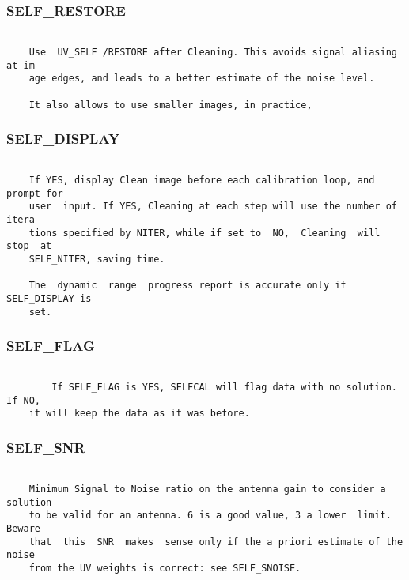\subsubsection{SELF\_RESTORE}
\begin{verbatim}

    Use  UV_SELF /RESTORE after Cleaning. This avoids signal aliasing at im-
    age edges, and leads to a better estimate of the noise level.

    It also allows to use smaller images, in practice,

\end{verbatim}
\subsubsection{SELF\_DISPLAY}
\begin{verbatim}

    If YES, display Clean image before each calibration loop, and prompt for
    user  input. If YES, Cleaning at each step will use the number of itera-
    tions specified by NITER, while if set to  NO,  Cleaning  will  stop  at
    SELF_NITER, saving time.

    The  dynamic  range  progress report is accurate only if SELF_DISPLAY is
    set.

\end{verbatim}
\subsubsection{SELF\_FLAG}
\begin{verbatim}

        If SELF_FLAG is YES, SELFCAL will flag data with no solution. If NO,
    it will keep the data as it was before.

\end{verbatim}
\subsubsection{SELF\_SNR}
\begin{verbatim}

    Minimum Signal to Noise ratio on the antenna gain to consider a solution
    to be valid for an antenna. 6 is a good value, 3 a lower  limit.  Beware
    that  this  SNR  makes  sense only if the a priori estimate of the noise
    from the UV weights is correct: see SELF_SNOISE.

\end{verbatim}
